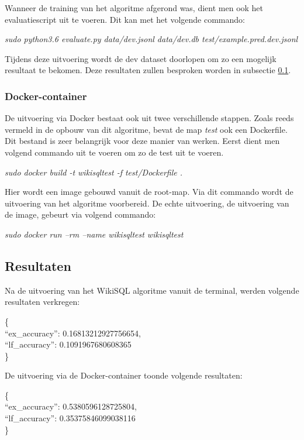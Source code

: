 Wanneer de training van het algoritme afgerond was, dient men ook het evaluatiescript uit te voeren. Dit kan met het volgende commando:
\begin{center}
	\textit{sudo python3.6 evaluate.py data/dev.jsonl data/dev.db test/example.pred.dev.jsonl}
\end{center}

Tijdens deze uitvoering wordt de dev dataset doorlopen om zo een mogelijk resultaat te bekomen. Deze resultaten zullen besproken worden in subsectie \ref{sec:resultwikisql}.

\subsubsection{Docker-container}

De uitvoering via Docker bestaat ook uit twee verschillende stappen. Zoals reeds vermeld in de opbouw van dit algoritme, bevat de map \textit{test} ook een Dockerfile. Dit bestand is zeer belangrijk voor deze manier van werken. Eerst dient men volgend commando uit te voeren om zo de test uit te voeren.
\begin{center}
	\textit{sudo docker build -t wikisqltest -f test/Dockerfile .}
\end{center}

Hier wordt een image gebouwd vanuit de root-map. Via dit commando wordt de uitvoering van het algoritme voorbereid. De echte uitvoering, de uitvoering van de image, gebeurt via volgend commando:
\begin{center}
	\textit{sudo docker run --rm --name wikisqltest wikisqltest}
\end{center}

\subsection{Resultaten}
\label{sec:resultwikisql}

Na de uitvoering van het WikiSQL algoritme vanuit de terminal, werden volgende resultaten verkregen:

\{ \\
“ex\_accuracy”: 0.16813212927756654, \\
“lf\_accuracy”: 0.1091967680608365 \\
\}

De uitvoering via de Docker-container toonde volgende resultaten: 

\{ \\
“ex\_accuracy”: 0.5380596128725804, \\
“lf\_accuracy”: 0.35375846099038116 \\
\}

